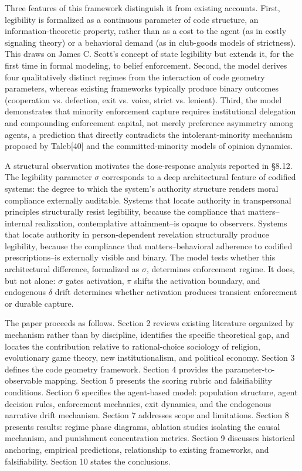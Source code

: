 \documentclass[12pt]{article}
\begin{document}
Three features of this framework distinguish it from existing accounts. First, legibility is formalized as a continuous parameter of code structure, an information-theoretic property, rather than as a cost to the agent (as in costly signaling theory) or a behavioral demand (as in club-goods models of strictness). This draws on James C. Scott's concept of state legibility but extends it, for the first time in formal modeling, to belief enforcement. Second, the model derives four qualitatively distinct regimes from the interaction of code geometry parameters, whereas existing frameworks typically produce binary outcomes (cooperation vs. defection, exit vs. voice, strict vs. lenient). Third, the model demonstrates that minority enforcement capture requires institutional delegation and compounding enforcement capital, not merely preference asymmetry among agents, a prediction that directly contradicts the intolerant-minority mechanism proposed by Taleb[40] and the committed-minority models of opinion dynamics.


A structural observation motivates the dose-response analysis reported in
\S8.12. The legibility parameter $\sigma$ corresponds to a deep
architectural feature of codified systems: the degree to which the
system's authority structure renders moral compliance externally
auditable. Systems that locate authority in transpersonal principles
structurally resist legibility, because the compliance that
matters--internal realization, contemplative attainment--is opaque to
observers. Systems that locate authority in person-dependent revelation
structurally produce legibility, because the compliance that
matters--behavioral adherence to codified prescriptions--is externally
visible and binary. The model tests whether this architectural
difference, formalized as $\sigma$, determines enforcement regime. It
does, but not alone: $\sigma$ gates activation, $\pi$ shifts the
activation boundary, and endogenous $\delta$ drift determines whether
activation produces transient enforcement or durable capture.

The paper proceeds as follows. Section 2 reviews existing literature organized by mechanism rather than by discipline, identifies the specific theoretical gap, and locates the contribution relative to rational-choice sociology of religion, evolutionary game theory, new institutionalism, and political economy. Section 3 defines the code geometry framework. Section 4 provides the parameter-to-observable mapping. Section 5 presents the scoring rubric and falsifiability conditions. Section 6 specifies the agent-based model: population structure, agent decision rules, enforcement mechanics, exit dynamics, and the endogenous narrative drift mechanism. Section 7 addresses scope and limitations. Section 8 presents results: regime phase diagrams, ablation studies isolating the causal mechanism, and punishment concentration metrics. Section 9 discusses historical anchoring, empirical predictions, relationship to existing frameworks, and falsifiability. Section 10 states the conclusions.
\end{document}
